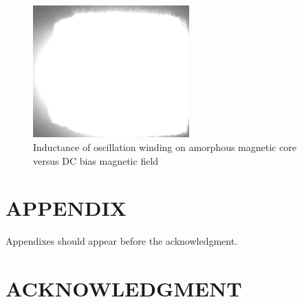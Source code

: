 \documentclass[letterpaper, 10 pt, conference]{ieeeconf}  %
\begin{document}
\begin{figure}[tpb]
\centering
\includegraphics[width=6cm]{./example_raw.png}
\caption{Inductance of oscillation winding on amorphous
magnetic core versus DC bias magnetic field}
\label{figurelabel}
\end{figure}
   
\addtolength{\textheight}{-12cm}   %







\section*{APPENDIX}

Appendixes should appear before the acknowledgment.

\section*{ACKNOWLEDGMENT}




\end{document}
